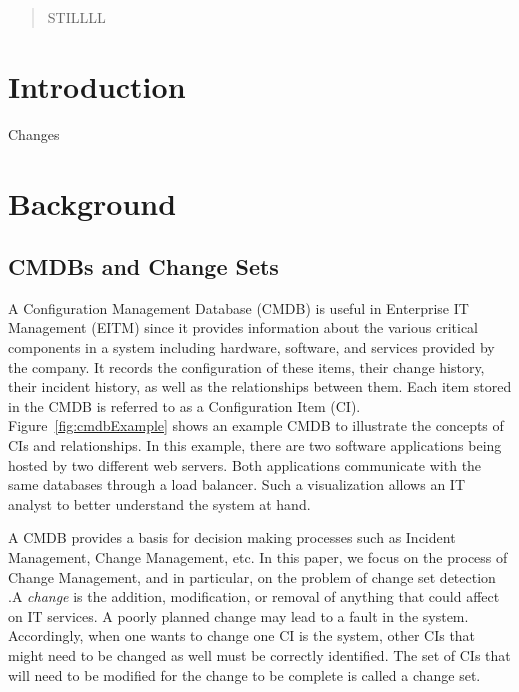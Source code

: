 \documentclass{article}
\begin{document}
 


\begin{abstract} 
STILLLL
\end{abstract} 

\section{Introduction}
\label{intro}

Changes

\section{Background}

\subsection{CMDBs and Change Sets}
A Configuration Management Database (CMDB) is useful in Enterprise IT Management (EITM) since it provides information about the various critical components in a
system including hardware, software, and services provided by the company. It records the configuration of these items, their change history, their incident
history, as well as the relationships between them. Each item stored in the CMDB is referred to as a Configuration Item (CI). Figure~\ref{fig:cmdbExample} shows
an example CMDB to illustrate the concepts of CIs and relationships. In this example, there are two software applications being hosted by two different web
servers. Both applications communicate with the same databases through a load balancer. Such a visualization allows an IT analyst to better understand the
system at hand.

A CMDB provides a basis for decision making processes such as Incident Management, Change Management, etc.  In this paper, we focus on the process of Change
Management, and in particular, on the problem of change set detection .A \textit{change} is the addition, modification, or removal of anything that could affect
on IT services. A poorly planned change may lead to a fault in the system. Accordingly, when one wants to change one CI is the system, other CIs that might
need to be changed as well must be correctly identified. The set of CIs that will need to be modified for the change to be complete is called a change set.
\end{document}

